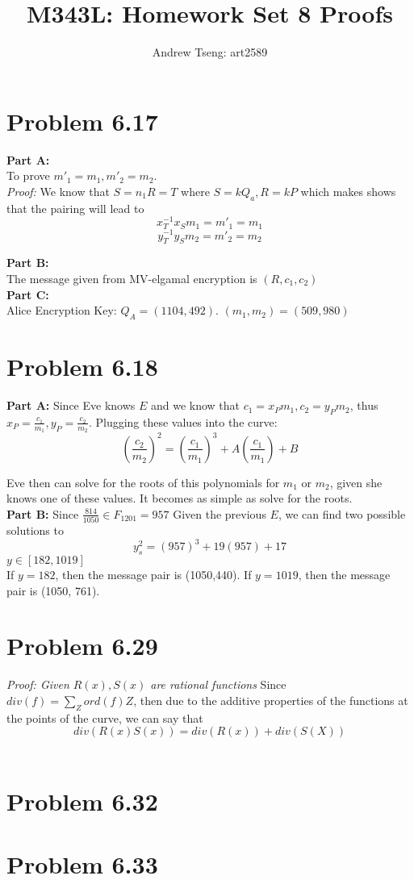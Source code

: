 \documentclass[10pt]{amsart}
\title{\LARGE M343L: Homework Set 8 Proofs}
\author{Andrew Tseng: art2589}
\begin{document}
\maketitle
\thispagestyle{empty}

\section*{\small \textbf{Problem 6.17}}

\noindent \textbf{\small Part A:} \\
To prove $m'_{1} = m_{1}, m'_{2} = m_{2}$. \\
\textit{Proof:}
We know that $S = n_{1}R = T$ where $S = kQ_{a}, R = kP$ which makes shows
that the pairing will lead to
\[x_{T}^{-1}x_{S}m_{1} = m'_{1} = m_{1}\]
\[y_{T}^{-1}y_{S}m_{2} = m'_{2} = m_{2}\]

\noindent \textbf{\small Part B:} \\
The message given from MV-elgamal encryption is $(R, c_{1}, c_{2})$ \\

\noindent \textbf{\small Part C:} \\
Alice Encryption Key: $Q_{A} = (1104, 492)$.
$(m_{1}, m_{2}) = (509, 980)$\\

\section*{\small \textbf{Problem 6.18}}
\noindent \textbf{\small Part A:}
Since Eve knows $E$ and we know that $c_{1} = x_{P}m_{1}, c_{2} = y_{P}m_{2}$,
thus $x_{P} = \frac{c_{1}}{m_{1}}, y_{P} = \frac{c_{2}}{m_{2}}$. Plugging these
values into the curve:
\[(\frac{c_{2}}{m_{2}})^2 = (\frac{c_{1}}{m_{1}})^3 + A(\frac{c_{1}}{m_{1}})
+ B\]

Eve then can solve for the roots of this polynomials for $m_{1}$ or $m_{2}$,
given she knows one of these values. It becomes as simple as solve for the roots.\\

\noindent \textbf{\small \textbf{Part B:}}
Since $\frac{814}{1050} \in F_{1201} = 957$
Given the previous $E$, we can find two possible solutions to
\[y_{s}^2 = (957)^3 + 19(957) + 17\]
\textit{$y \in [182, 1019]$}\\
If $y = 182$, then the message pair is (1050,440).
If $y = 1019$, then the message pair is (1050, 761).\\

\section*{\small \textbf{Problem 6.29}}
\textit{Proof: Given $R(x),S(x)$ are rational functions}
Since $div(f) = \sum_{Z}^{} ord(f)Z$, then due to the additive properties of the functions
at the points of the curve, we can say that 
\[div(R(x)S(x)) = div(R(x)) + div(S(X))\]
\\

\section*{\small \textbf{Problem 6.32}}


\section*{\small \textbf{Problem 6.33}}
\end{document}
